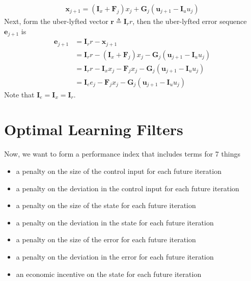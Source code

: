\documentclass[landscape]{article}
\begin{document}
\begin{align}
\mathbf{x}_{j+1} = \left(\mathbf{I}_x +\mathbf{F}_j \right)x_j + \mathbf{G}_j \left(\mathbf{u}_{j+1} - \mathbf{I}_u u_j \right)
\end{align}
Next, form the uber-lyfted vector $\mathbf{r} \triangleq \mathbf{I}_r r$, then the uber-lyfted error sequence $\mathbf{e}_{j+1}$ is
\begin{align}
\mathbf{e}_{j+1} 
& = \mathbf{I}_r r - \mathbf{x}_{j+1}\\
& = \mathbf{I}_r r - \left(\mathbf{I}_x +\mathbf{F}_j \right)x_j - \mathbf{G}_j \left(\mathbf{u}_{j+1} - \mathbf{I}_u u_j \right)\\
& = \mathbf{I}_r r - \mathbf{I}_x x_j - \mathbf{F}_j x_j - \mathbf{G}_j \left(\mathbf{u}_{j+1} - \mathbf{I}_u u_j \right)\\
& = \mathbf{I}_e e_j - \mathbf{F}_j x_j - \mathbf{G}_j \left(\mathbf{u}_{j+1} - \mathbf{I}_u u_j \right)
\end{align}
Note that $\mathbf{I}_e=\mathbf{I}_x=\mathbf{I}_r$.

\section{Optimal Learning Filters}
Now, we want to form a performance index that includes terms for 7 things 
\begin{itemize}
	\item a penalty on the size of the control input for each future iteration
	\item a penalty on the deviation in the control input for each future iteration
	\item a penalty on the size of the state for each future iteration
	\item a penalty on the deviation in the state for each future iteration
	\item a penalty on the size of the error for each future iteration
	\item a penalty on the deviation in the error for each future iteration
	\item an economic incentive on the state for each future iteration
\end{itemize}
\end{document}
